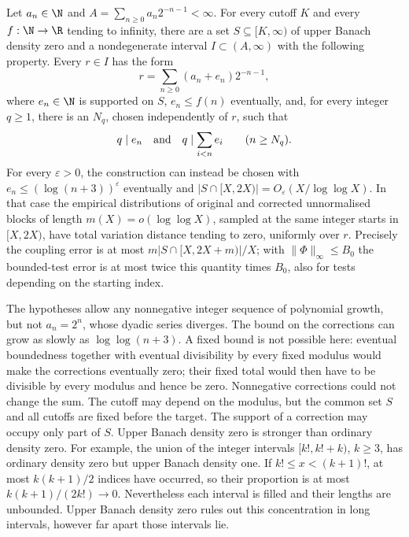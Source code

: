 \begin{theorem}
\label{long251:res:sparse-rationalisation}
Let $a_n\in\N$ and $A=\sum_{n\ge0}a_n2^{-n-1}<\infty$.  For every cutoff
$K$ and every $f:\N\to\R$ tending to infinity, there are a set
$S\subseteq[K,\infty)$ of upper Banach density zero and a nondegenerate
interval $I\subset(A,\infty)$ with the following property.  Every $r\in I$
has the form
\[
 r=\sum_{n\ge0}(a_n+e_n)2^{-n-1},
\]
where $e_n\in\N$ is supported on $S$, $e_n\le f(n)$ eventually, and, for
every integer $q\ge1$, there is an $N_q$, chosen independently of $r$, such that
\[
 q\mid e_n\quad\hbox{and}\quad q\mid\sum_{i<n}e_i
 \qquad(n\ge N_q).
\]
For every $\varepsilon>0$, the construction can instead be chosen with
$e_n\le(\log(n+3))^\varepsilon$ eventually and
$|S\cap[X,2X)|=O_\varepsilon(X/\log\log X)$.  In that case the empirical
distributions of original and corrected unnormalised blocks of length
$m(X)=o(\log\log X)$, sampled at the same integer starts in $[X,2X)$,
have total variation distance tending to zero, uniformly over $r$.
Precisely the coupling error is at most $m|S\cap[X,2X+m)|/X$; with
$\|\Phi\|_\infty\le B_0$ the bounded-test error is at most twice this
quantity times $B_0$, also for tests depending on the starting index.
\end{theorem}

The hypotheses allow any nonnegative integer sequence of polynomial
growth, but not $a_n=2^n$, whose dyadic series diverges.  The bound on the
corrections can grow as slowly as $\log\log(n+3)$.  A fixed bound is not
possible here: eventual boundedness together with eventual divisibility
by every fixed modulus would make the corrections eventually zero; their
fixed total would then have to be divisible by every modulus and hence be
zero.  Nonnegative corrections could not change the sum.
The cutoff may depend on the modulus, but the common set $S$ and all
cutoffs are fixed before the target.  The support of a correction may
occupy only part of $S$.
Upper Banach density zero is stronger than ordinary density zero.  For example, the union of the integer intervals
$[k!,k!+k)$, $k\ge3$, has ordinary density zero but upper Banach density
one.  If $k!\le x<(k+1)!$, at most $k(k+1)/2$ indices have occurred,
so their proportion is at most $k(k+1)/(2k!)\to0$.  Nevertheless each
interval is filled and their lengths are unbounded.  Upper Banach density zero rules out this concentration in long intervals,
however far apart those intervals lie.

